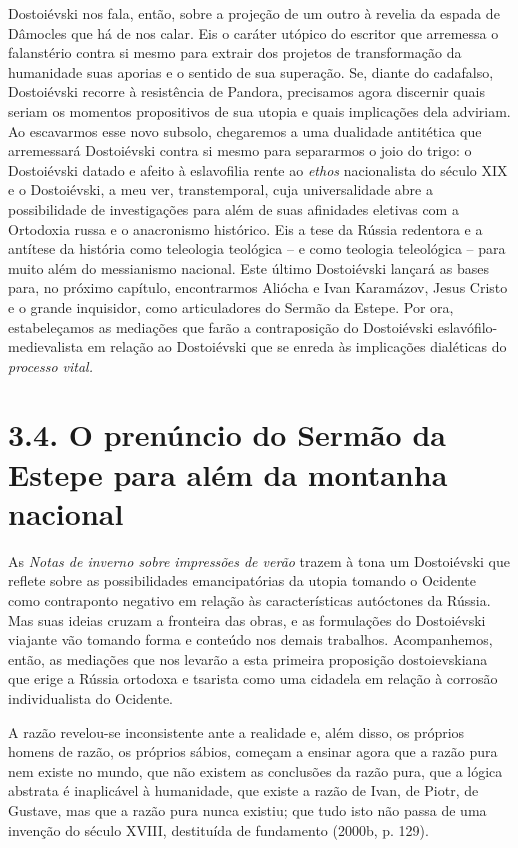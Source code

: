 Dostoiévski nos fala, então, sobre a projeção de um outro à revelia da
espada de Dâmocles que há de nos calar. Eis o caráter utópico do
escritor que arremessa o falanstério contra si mesmo para extrair dos
projetos de transformação da humanidade suas aporias e o sentido de sua
superação. Se, diante do cadafalso, Dostoiévski recorre à resistência de
Pandora, precisamos agora discernir quais seriam os momentos
propositivos de sua utopia e quais implicações dela adviriam. Ao
escavarmos esse novo subsolo, chegaremos a uma dualidade antitética que
arremessará Dostoiévski contra si mesmo para separarmos o joio do trigo:
o Dostoiévski datado e afeito à eslavofilia rente ao \emph{ethos}
nacionalista do século XIX e o Dostoiévski, a meu ver, transtemporal,
cuja universalidade abre a possibilidade de investigações para além de
suas afinidades eletivas com a Ortodoxia russa e o anacronismo
histórico. Eis a tese da Rússia redentora e a antítese da história como
teleologia teológica -- e como teologia teleológica -- para muito além
do messianismo nacional. Este último Dostoiévski lançará as bases para,
no próximo capítulo, encontrarmos Aliócha e Ivan Karamázov, Jesus Cristo
e o grande inquisidor, como articuladores do Sermão da Estepe. Por ora,
estabeleçamos as mediações que farão a contraposição do Dostoiévski
eslavófilo-medievalista em relação ao Dostoiévski que se enreda às
implicações dialéticas do \emph{processo vital.}

\section{3.4. O prenúncio do Sermão da Estepe para além da montanha
nacional}

As \emph{Notas de inverno sobre impressões de verão} trazem à tona um
Dostoiévski que reflete sobre as possibilidades emancipatórias da utopia
tomando o Ocidente como contraponto negativo em relação às
características autóctones da Rússia. Mas suas ideias cruzam a fronteira
das obras, e as formulações do Dostoiévski viajante vão tomando forma e
conteúdo nos demais trabalhos. Acompanhemos, então, as mediações que nos
levarão a esta primeira proposição dostoievskiana que erige a Rússia
ortodoxa e tsarista como uma cidadela em relação à corrosão
individualista do Ocidente.

A razão revelou-se inconsistente ante a realidade e, além disso, os
próprios homens de razão, os próprios sábios, começam a ensinar agora
que a razão pura nem existe no mundo, que não existem as conclusões da
razão pura, que a lógica abstrata é inaplicável à humanidade, que existe
a razão de Ivan, de Piotr, de Gustave, mas que a razão pura nunca
existiu; que tudo isto não passa de uma invenção do século XVIII,
destituída de fundamento (2000b, p. 129).

